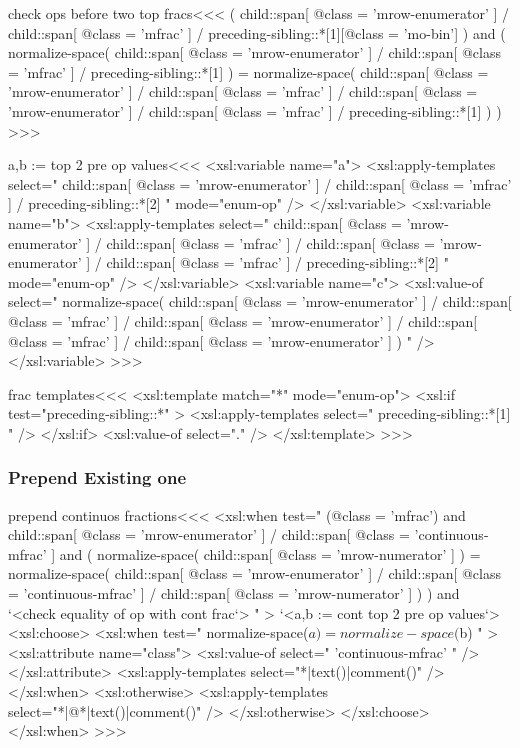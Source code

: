 \documentclass{article}
\begin{document}
\<check ops before two top fracs\><<<
(  child::span[ @class = 'mrow-enumerator' ] /
   child::span[ @class = 'mfrac' ] /
   preceding-sibling::*[1][@class = 'mo-bin']
)
and  
(  normalize-space(
   child::span[ @class = 'mrow-enumerator' ] /
   child::span[ @class = 'mfrac' ] /
   preceding-sibling::*[1] )
   =
   normalize-space(
   child::span[ @class = 'mrow-enumerator' ] /
   child::span[ @class = 'mfrac' ] /
   child::span[ @class = 'mrow-enumerator' ] /
   child::span[ @class = 'mfrac' ] /
   preceding-sibling::*[1] )
)
>>>



\<a,b := top 2 pre op values\><<<
<xsl:variable name="a">
   <xsl:apply-templates select="
         child::span[ @class = 'mrow-enumerator' ] /
         child::span[ @class = 'mfrac' ] /
         preceding-sibling::*[2] 
   "  mode="enum-op" />  
</xsl:variable>
<xsl:variable name="b">
   <xsl:apply-templates select="
         child::span[ @class = 'mrow-enumerator' ] /
         child::span[ @class = 'mfrac' ] /
         child::span[ @class = 'mrow-enumerator' ] /
         child::span[ @class = 'mfrac' ] /
         preceding-sibling::*[2] 
   "  mode="enum-op" />  
</xsl:variable>
<xsl:variable name="c">
   <xsl:value-of select="
    normalize-space(
      child::span[ @class = 'mrow-enumerator' ] /
      child::span[ @class = 'mfrac' ] /
      child::span[ @class = 'mrow-enumerator' ] /
      child::span[ @class = 'mfrac' ] /
      child::span[ @class = 'mrow-enumerator' ] )
   "  />  
</xsl:variable>
>>>


\<frac templates\><<<
<xsl:template match="*" mode="enum-op">
   <xsl:if test="preceding-sibling::*" >
      <xsl:apply-templates select=" preceding-sibling::*[1] " />
   </xsl:if>
   <xsl:value-of select="." />
</xsl:template>
>>>




\subsubsection{Prepend Existing one}



\<prepend continuos fractions\><<<
<xsl:when test="
      (@class = 'mfrac')
    and
      child::span[ @class = 'mrow-enumerator' ]
        / child::span[ @class = 'continuous-mfrac' ]
    and
      ( normalize-space(
          child::span[ @class = 'mrow-numerator' ]
        )
        =
        normalize-space(
          child::span[ @class = 'mrow-enumerator' ]
           / child::span[ @class = 'continuous-mfrac' ]
           / child::span[ @class = 'mrow-numerator' ]  
        )
      ) 
    and `<check equality of op with cont frac`>
" >
  `<a,b := cont top 2 pre op values`>
  <xsl:choose>
     <xsl:when test="
         normalize-space($a)=normalize-space($b)
     " >
         <xsl:attribute name="class">
            <xsl:value-of select=" 'continuous-mfrac' " />
         </xsl:attribute>         
         <xsl:apply-templates select="*|text()|comment()" />
     </xsl:when>
     <xsl:otherwise>
         <xsl:apply-templates select="*|@*|text()|comment()" />
     </xsl:otherwise>
  </xsl:choose>
</xsl:when> 
>>>
\end{document}
